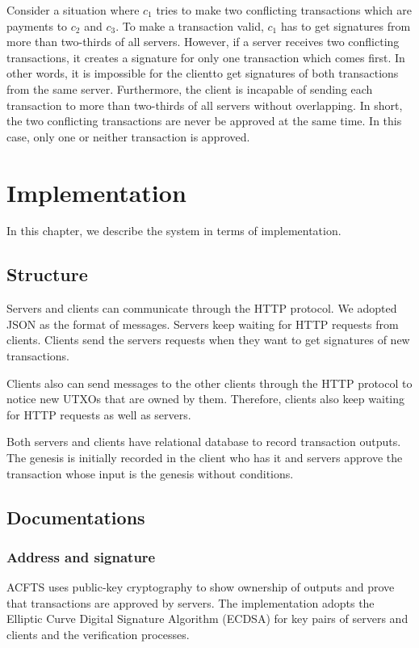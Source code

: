\documentclass[a4paper, oneside]{discothesis}
\begin{document}
Consider a situation where $c_1$ tries to make two conflicting transactions
which are payments to $c_2$ and $c_3$.
To make a transaction valid,
$c_1$ has to get signatures from more than two-thirds of all servers.
However, if a server receives two conflicting transactions,
it creates a signature for only one transaction which comes first.
In other words, it is impossible for the clientto get signatures of both transactions
from the same server.
Furthermore, the client is incapable of sending each transaction
to more than two-thirds of all servers without overlapping.
In short, the two conflicting transactions are never be approved at the same time.
In this case, only one or neither transaction is approved.


\chapter{Implementation}
In this chapter, we describe the system in terms of implementation.

\section{Structure}
Servers and clients can communicate through the HTTP protocol.
We adopted JSON as the format of messages.
Servers keep waiting for HTTP requests from clients.
Clients send the servers requests when they want to get signatures of new transactions.

Clients also can send messages to the other clients through the HTTP protocol
to notice new UTXOs that are owned by them.
Therefore, clients also keep waiting for HTTP requests as well as servers.

Both servers and clients have relational database to record transaction outputs.
The genesis is initially recorded in the client who has it
and servers approve the transaction whose input is the genesis without conditions.



\section{Documentations}

\subsection{Address and signature}
ACFTS uses public-key cryptography to show ownership of outputs
and prove that transactions are approved by servers.
The implementation adopts the Elliptic Curve Digital Signature Algorithm (ECDSA)
for key pairs of servers and clients and the verification processes.
\end{document}
